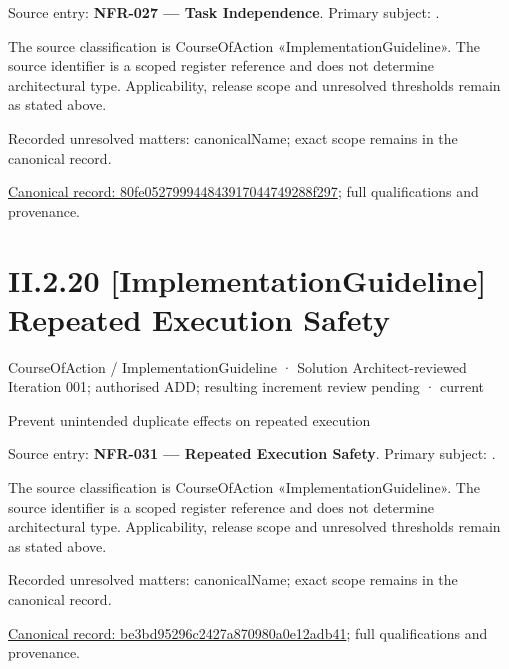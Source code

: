 Source entry: \textbf{NFR-027 — Task Independence}. Primary subject: \texttt{}.



The source classification is CourseOfAction «ImplementationGuideline». The source identifier is a scoped register reference and does not determine architectural type. Applicability, release scope and unresolved thresholds remain as stated above.


{\small Recorded unresolved matters: canonicalName; exact scope remains in the canonical record.}\par
{\footnotesize \href{../../../../continuum/strategy/course-of-action/implementation-guideline/80fe052799944843917044749288f297.md}{Canonical record: 80fe052799944843917044749288f297}; full qualifications and provenance.}\par
\section*{II.2.20 [ImplementationGuideline] Repeated Execution Safety}
\label{navigation:II.2.20}

\label{element:be3bd95296c2427a870980a0e12adb41}
{\small CourseOfAction / ImplementationGuideline · Solution Architect-reviewed Iteration 001; authorised ADD; resulting increment review pending · current}\par

Prevent unintended duplicate effects on repeated execution



Source entry: \textbf{NFR-031 — Repeated Execution Safety}. Primary subject: \texttt{}.



The source classification is CourseOfAction «ImplementationGuideline». The source identifier is a scoped register reference and does not determine architectural type. Applicability, release scope and unresolved thresholds remain as stated above.


{\small Recorded unresolved matters: canonicalName; exact scope remains in the canonical record.}\par
{\footnotesize \href{../../../../continuum/strategy/course-of-action/implementation-guideline/be3bd95296c2427a870980a0e12adb41.md}{Canonical record: be3bd95296c2427a870980a0e12adb41}; full qualifications and provenance.}\par
